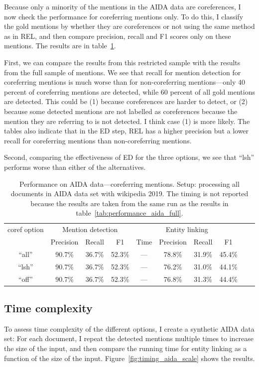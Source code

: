 \documentclass[a4paper,11pt]{article}
\numberwithin{equation}{section} %
\begin{document}
Because only a minority of the mentions in the AIDA data are coreferences, I now check the performance for coreferring mentions only. To do this, I classify the gold mentions by whether they are coreferences or not using the same method as in REL, and then compare precision, recall and F1 scores only on these mentions. The results are in table~\ref{tab:performance_aida_corefs}. 

First, we can compare the results from this restricted sample with the results from the full sample of mentions. We see that recall for mention detection for coreferring mentions is much worse than for non-coreferring mentions---only 40 percent of coreferring mentions are detected, while 60 percent of all gold mentions are detected. 
This could be (1) because coreferences are harder to detect, or (2) because some detected mentions are not labelled as coreferences because the mention they are referring to is not detected. I think case (1) is more likely.
The tables also indicate that in the ED step, REL has a higher precision but a lower recall for coreferring mentions than non-coreferring mentions. 

Second, comparing the effectiveness of ED for the three options, we see that ``lsh'' performs worse than either of the alternatives.



\begin{table}
 \begin{tabular}{c c c c c c c c c c}
\hline
 coref option & \multicolumn{3}{c}{Mention detection} & \multicolumn{4}{c}{Entity linking}  \\
        & Precision & Recall & F1 & Time & Precision & Recall & F1 \\
 \hline 
 ``all'' & 90.7\% & 36.7\% & 52.3\% & --- & 78.8\% & 31.9\% & 45.4\% \\  
 ``lsh'' & 90.7\% & 36.7\% & 52.3\% & --- & 76.2\% & 31.0\% & 44.1\% \\
 ``off'' & 90.7\% & 36.7\% & 52.3\% & --- & 76.8\% & 31.3\% & 44.4\% \\ 
\hline 
\end{tabular}
\caption{Performance on AIDA data---coreferring mentions. Setup: processing all documents in AIDA data set with wikipedia 2019. The timing is not reported because the results are taken from the same run as the results in table~\ref{tab:performance_aida_full}.}
\label{tab:performance_aida_corefs}
\end{table}


\subsection{Time complexity}
To assess time complexity of the different options, I create a synthetic AIDA data set: For each document, I repeat the detected mentions multiple times to increase the size of the input, and then compare the running time for entity linking as a function of the size of the input. Figure~\ref{fig:timing_aida_scale} shows the results.
\end{document}
